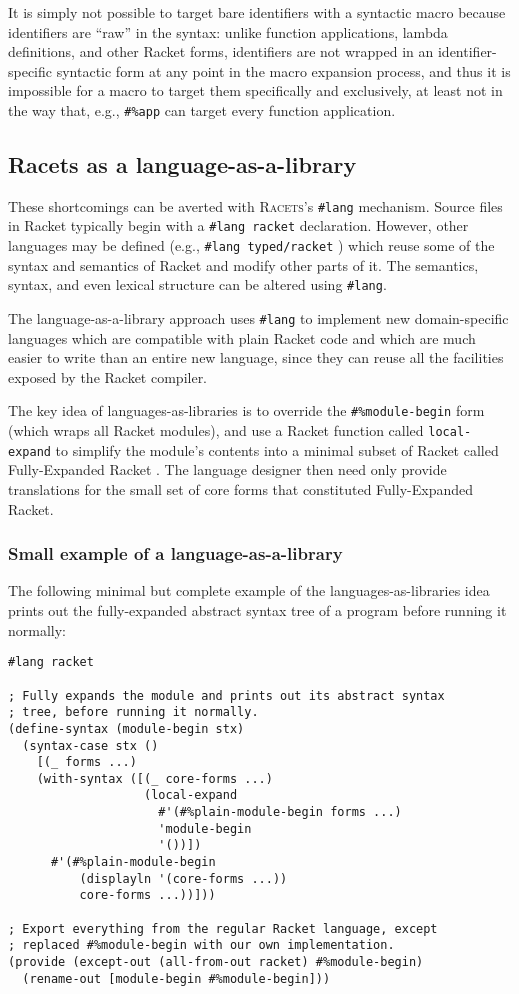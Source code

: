 \documentclass{article}
\begin{document}
It is simply not possible to target bare identifiers with a syntactic macro because identifiers are ``raw'' in the syntax: unlike function applications, lambda definitions, and other Racket forms, identifiers are not wrapped in an identifier-specific syntactic form at any point in the macro expansion process, and thus it is impossible for a macro to target them specifically and exclusively, at least not in the way that, e.g., \texttt{\#\%app} can target every function application.


\subsection{Racets as a language-as-a-library}
These shortcomings can be averted with \textsc{Racets}'s \texttt{\#lang} mechanism. Source files in Racket typically begin with a \texttt{\#lang racket} declaration. However, other languages may be defined (e.g., \texttt{\#lang typed/racket} \cite{typed-racket}) which reuse some of the syntax and semantics of Racket and modify other parts of it. The semantics, syntax, and even lexical structure can be altered using \texttt{\#lang}.

The language-as-a-library approach \cite{typed-racket} uses \texttt{\#lang} to implement new domain-specific languages which are compatible with plain Racket code and which are much easier to write than an entire new language, since they can reuse all the facilities exposed by the Racket compiler.

The key idea of languages-as-libraries is to override the \texttt{\#\%module-begin} form (which wraps all Racket modules), and use a Racket function called \texttt{local-expand} to simplify the module's contents into a minimal subset of Racket called Fully-Expanded Racket \cite{fe-racket}. The language designer then need only provide translations for the small set of core forms that constituted Fully-Expanded Racket.


\subsubsection{Small example of a language-as-a-library}
The following minimal but complete example of the languages-as-libraries idea prints out the fully-expanded abstract syntax tree of a program before running it normally:

\begin{lstlisting}
#lang racket

; Fully expands the module and prints out its abstract syntax
; tree, before running it normally.
(define-syntax (module-begin stx)
  (syntax-case stx ()
    [(_ forms ...)
    (with-syntax ([(_ core-forms ...)
                   (local-expand
                     #'(#%plain-module-begin forms ...)
                     'module-begin
                     '())])
      #'(#%plain-module-begin
          (displayln '(core-forms ...))
          core-forms ...))]))

; Export everything from the regular Racket language, except
; replaced #%module-begin with our own implementation.
(provide (except-out (all-from-out racket) #%module-begin)
  (rename-out [module-begin #%module-begin]))
\end{lstlisting}
\end{document}
